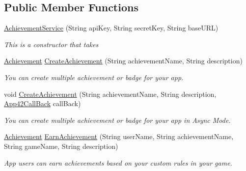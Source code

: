 \subsection*{Public Member Functions}
\begin{DoxyCompactItemize}
\item 
\hyperlink{classcom_1_1shephertz_1_1app42_1_1paas_1_1sdk_1_1csharp_1_1achievement_1_1_achievement_service_aab235dce42b9c97d666f0b41ae853795}{Achievement\+Service} (String api\+Key, String secret\+Key, String base\+U\+R\+L)
\begin{DoxyCompactList}\small\item\em This is a constructor that takes \end{DoxyCompactList}\item 
\hyperlink{classcom_1_1shephertz_1_1app42_1_1paas_1_1sdk_1_1csharp_1_1achievement_1_1_achievement}{Achievement} \hyperlink{classcom_1_1shephertz_1_1app42_1_1paas_1_1sdk_1_1csharp_1_1achievement_1_1_achievement_service_aa27354c785f0b49f7b85b8c3b935272e}{Create\+Achievement} (String achievement\+Name, String description)
\begin{DoxyCompactList}\small\item\em You can create multiple achievement or badge for your app. \end{DoxyCompactList}\item 
void \hyperlink{classcom_1_1shephertz_1_1app42_1_1paas_1_1sdk_1_1csharp_1_1achievement_1_1_achievement_service_a10fc3d75a4b96b3a44147899d2dbd060}{Create\+Achievement} (String achievement\+Name, String description, \hyperlink{interfacecom_1_1shephertz_1_1app42_1_1paas_1_1sdk_1_1csharp_1_1_app42_call_back}{App42\+Call\+Back} call\+Back)
\begin{DoxyCompactList}\small\item\em You can create multiple achievement or badge for your app in Async Mode. \end{DoxyCompactList}\item 
\hyperlink{classcom_1_1shephertz_1_1app42_1_1paas_1_1sdk_1_1csharp_1_1achievement_1_1_achievement}{Achievement} \hyperlink{classcom_1_1shephertz_1_1app42_1_1paas_1_1sdk_1_1csharp_1_1achievement_1_1_achievement_service_a5911439bca19493aace04a3e5de09774}{Earn\+Achievement} (String user\+Name, String achievement\+Name, String game\+Name, String description)
\begin{DoxyCompactList}\small\item\em App users can earn achievements based on your custom rules in your game. \end{DoxyCompactList}\item 

\end{DoxyCompactItemize}
